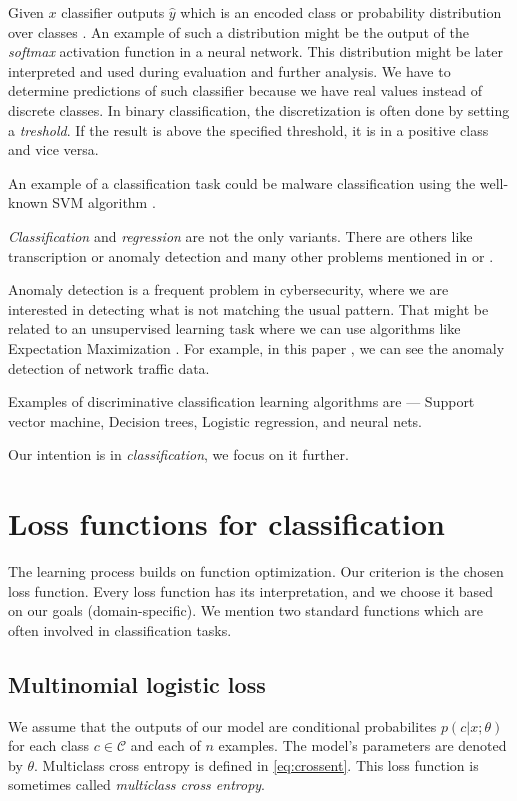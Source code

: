 Given $x$ classifier outputs $\hat{y}$ which is an encoded class or probability distribution over classes \cite{GoodBengCour16}. An example of such a distribution might be the output of the \emph{softmax} activation function in a neural network. This distribution might be later interpreted and used during evaluation and further analysis. We have to determine predictions of such classifier because we have real values instead of discrete classes. In binary classification, the discretization is often done by setting a \emph{treshold}. If the result is above the specified threshold, it is in a positive class and vice versa.

An example of a classification task could be malware classification using the well-known SVM algorithm \cite{Kruczkowski2014}.

\emph{Classification} and \emph{regression} are not the only variants. There are others like transcription \cite{GoodBengCour16} or anomaly detection \cite{Chandola2009} and many other problems mentioned in \cite{GoodBengCour16} or \cite{zhang2020dive}. 

Anomaly detection is a frequent problem in cybersecurity, where we are interested in detecting what is not matching the usual pattern. That might be related to an unsupervised learning task where we can use algorithms like Expectation Maximization \cite{Dempster1977}. For example, in this paper \cite{IglesiasVazquez2014}, we can see the anomaly detection of network traffic data.

Examples of discriminative classification learning algorithms are --- Support vector machine, Decision trees, Logistic regression, and neural nets.

Our intention is in \emph{classification}, we focus on it further.


\section{Loss functions for classification}
The learning process builds on function optimization. Our criterion is the chosen loss function. Every loss function has its interpretation, and we choose it based on our goals (domain-specific). We mention two standard functions which are often involved in classification tasks.

\subsection*{Multinomial logistic loss} 
We assume that the outputs of our model are conditional probabilites $p(c|x;\theta)$ for each class $c \in \mathcal{C}$ and each of $n$ examples. The model's parameters are denoted by $\theta$.
Multiclass cross entropy is defined in \eqref{eq:crossent}. This loss function is sometimes called \emph{multiclass cross entropy}.

